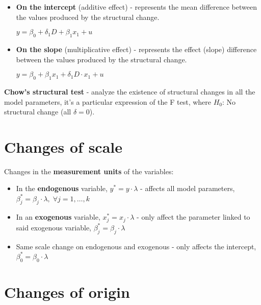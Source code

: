 \documentclass[10pt, a4paper, landscape]{article}
\begin{document}
\begin{multicols}{3}
		\begin{itemize}[leftmargin=*]
			\item \textbf{On the intercept} (additive effect) - represents the mean difference between the values produced by the structural change.
			
			\begin{center}
				$y = \beta_{0} + \delta_{1} D + \beta_{1} x_{1} + u$
			\end{center}
			
			\item \textbf{On the slope} (multiplicative effect) - represents the effect (slope) difference between the values produced by the structural change.
			
			\begin{center}
				$y = \beta_{0} + \beta_{1} x_{1} + \delta_{1} D \cdot x_{1} + u$
			\end{center}
		\end{itemize}
		
		\textbf{Chow's structural test} - analyze the existence of structural changes in all the model parameters, it's a particular expression of the F test, where $H_{0}$: No structural change (all $\delta = 0$).
		
		\section*{Changes of scale}
		
		Changes in the \textbf{measurement units} of the variables:
		
		\begin{itemize}[leftmargin=*]
			\item In the \textbf{endogenous} variable, $y^{*} = y \cdot \lambda$ - affects all model parameters, $\beta_{j}^{*} = \beta_{j} \cdot \lambda, \; \forall j = 1, \ldots, k$
			\item In an \textbf{exogenous} variable, $x_{j}^{*} = x_{j} \cdot \lambda$ - only affect the parameter linked to said exogenous variable, $\beta_{j}^{*} = \beta_{j} \cdot \lambda$
			\item Same scale change on endogenous and exogenous - only affects the intercept, $\beta_{0}^{*} = \beta_{0} \cdot \lambda$
		\end{itemize}
		
		\section*{Changes of origin}
		

\end{multicols}
\end{document}
